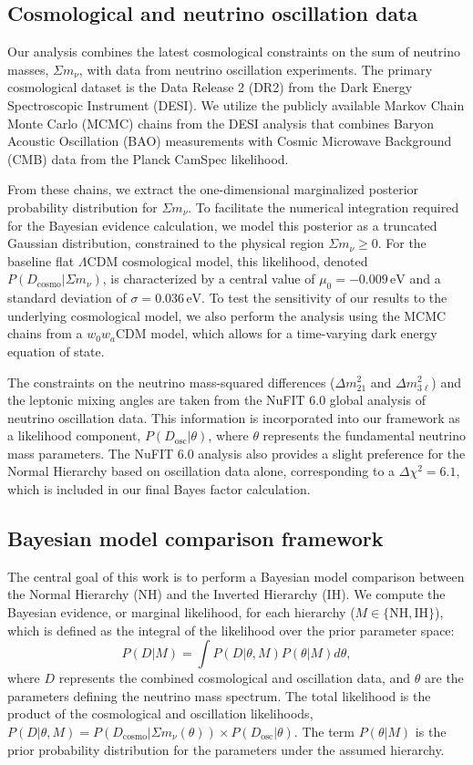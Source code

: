 \documentclass[]{article}
\begin{document}
\subsection{Cosmological and neutrino oscillation data}
Our analysis combines the latest cosmological constraints on the sum of neutrino masses, $\Sigma m_\nu$, with data from neutrino oscillation experiments. The primary cosmological dataset is the Data Release 2 (DR2) from the Dark Energy Spectroscopic Instrument (DESI). We utilize the publicly available Markov Chain Monte Carlo (MCMC) chains from the DESI analysis that combines Baryon Acoustic Oscillation (BAO) measurements with Cosmic Microwave Background (CMB) data from the Planck CamSpec likelihood.

From these chains, we extract the one-dimensional marginalized posterior probability distribution for $\Sigma m_\nu$. To facilitate the numerical integration required for the Bayesian evidence calculation, we model this posterior as a truncated Gaussian distribution, constrained to the physical region $\Sigma m_\nu \ge 0$. For the baseline flat $\Lambda$CDM cosmological model, this likelihood, denoted $P(D_{\text{cosmo}}|\Sigma m_\nu)$, is characterized by a central value of $\mu_0 = -0.009\,\text{eV}$ and a standard deviation of $\sigma = 0.036\,\text{eV}$. To test the sensitivity of our results to the underlying cosmological model, we also perform the analysis using the MCMC chains from a $w_0w_a$CDM model, which allows for a time-varying dark energy equation of state.

The constraints on the neutrino mass-squared differences ($\Delta m^2_{21}$ and $\Delta m^2_{3\ell}$) and the leptonic mixing angles are taken from the NuFIT 6.0 global analysis of neutrino oscillation data. This information is incorporated into our framework as a likelihood component, $P(D_{\text{osc}}|\theta)$, where $\theta$ represents the fundamental neutrino mass parameters. The NuFIT 6.0 analysis also provides a slight preference for the Normal Hierarchy based on oscillation data alone, corresponding to a $\Delta\chi^2 = 6.1$, which is included in our final Bayes factor calculation.

\subsection{Bayesian model comparison framework}
The central goal of this work is to perform a Bayesian model comparison between the Normal Hierarchy (NH) and the Inverted Hierarchy (IH). We compute the Bayesian evidence, or marginal likelihood, for each hierarchy ($M \in \{\text{NH}, \text{IH}\}$), which is defined as the integral of the likelihood over the prior parameter space:
\begin{equation}
P(D|M) = \int P(D|\theta, M) P(\theta|M) d\theta,
\end{equation}
where $D$ represents the combined cosmological and oscillation data, and $\theta$ are the parameters defining the neutrino mass spectrum. The total likelihood is the product of the cosmological and oscillation likelihoods, $P(D|\theta, M) = P(D_{\text{cosmo}}|\Sigma m_\nu(\theta)) \times P(D_{\text{osc}}|\theta)$. The term $P(\theta|M)$ is the prior probability distribution for the parameters under the assumed hierarchy.
\end{document}
